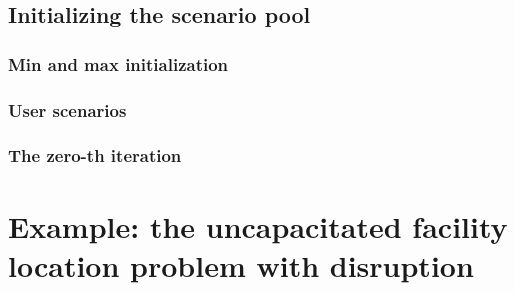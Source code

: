 
\subsection{Initializing the scenario pool}
\label{sec:ccg:initial-scenario}

\subsubsection{Min and max initialization}


\subsubsection{User scenarios}


\subsubsection{The zero-th iteration}


\section[Example: the UFLP with disruption]{Example: the uncapacitated facility location problem with disruption}

